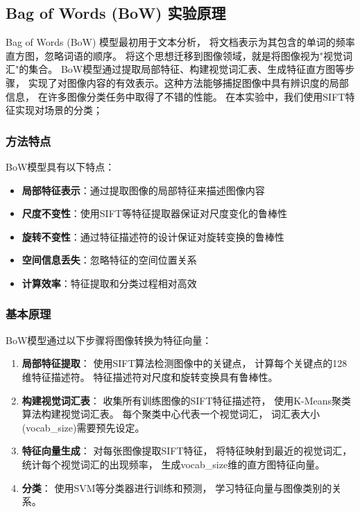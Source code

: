 \subsection{Bag of Words (BoW) 实验原理}

Bag of Words (BoW) 模型最初用于文本分析，
将文档表示为其包含的单词的频率直方图，忽略词语的顺序。
将这个思想迁移到图像领域，就是将图像视为"视觉词汇"的集合。
BoW模型通过提取局部特征、构建视觉词汇表、生成特征直方图等步骤，
实现了对图像内容的有效表示。这种方法能够捕捉图像中具有辨识度的局部信息，
在许多图像分类任务中取得了不错的性能。
在本实验中，我们使用SIFT特征实现对场景的分类；

\subsubsection{方法特点}
BoW模型具有以下特点：
\begin{itemize}
    \item \textbf{局部特征表示}：通过提取图像的局部特征来描述图像内容
    \item \textbf{尺度不变性}：使用SIFT等特征提取器保证对尺度变化的鲁棒性
    \item \textbf{旋转不变性}：通过特征描述符的设计保证对旋转变换的鲁棒性
    \item \textbf{空间信息丢失}：忽略特征的空间位置关系
    \item \textbf{计算效率}：特征提取和分类过程相对高效
\end{itemize}

\subsubsection{基本原理}
BoW模型通过以下步骤将图像转换为特征向量：

\begin{enumerate}
    \item \textbf{局部特征提取}：
    使用SIFT算法检测图像中的关键点，
    计算每个关键点的128维特征描述符。
    特征描述符对尺度和旋转变换具有鲁棒性。
    
    \item \textbf{构建视觉词汇表}：
    收集所有训练图像的SIFT特征描述符，
    使用K-Means聚类算法构建视觉词汇表。
    每个聚类中心代表一个视觉词汇，
    词汇表大小(vocab\_size)需要预先设定。
    
    \item \textbf{特征向量生成}：
    对每张图像提取SIFT特征，
    将特征映射到最近的视觉词汇，
    统计每个视觉词汇的出现频率，
    生成vocab\_size维的直方图特征向量。
    
    \item \textbf{分类}：
    使用SVM等分类器进行训练和预测，
    学习特征向量与图像类别的关系。
\end{enumerate}

